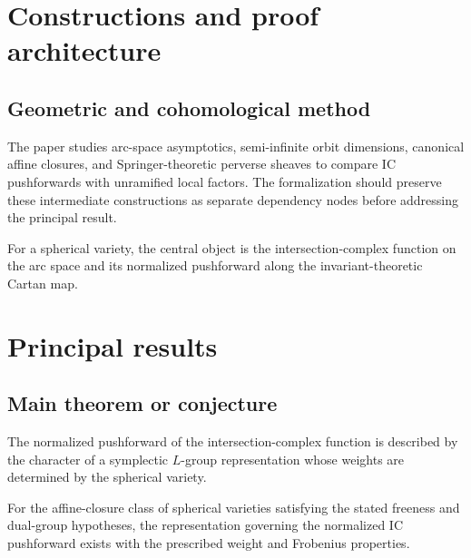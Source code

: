 \chapter{Constructions and proof architecture}
\label{chap:intersection-complexes-unramified-l-factors-method}

\section{Geometric and cohomological method}
\label{sec:intersection-complexes-unramified-l-factors-method}

The paper studies arc-space asymptotics, semi-infinite orbit dimensions, canonical affine closures, and Springer-theoretic perverse sheaves to compare IC pushforwards with unramified local factors. The formalization should preserve these intermediate constructions
as separate dependency nodes before addressing the principal result.

\begin{definition}
\label{intersection-complexes-unramified-l-factors-central-object}
For a spherical variety, the central object is the intersection-complex function on the arc space and its normalized pushforward along the invariant-theoretic Cartan map.
\notready
\end{definition}

\chapter{Principal results}
\label{chap:intersection-complexes-unramified-l-factors-results}

\section{Main theorem or conjecture}
\label{sec:intersection-complexes-unramified-l-factors-results}

\begin{conjecture}
\label{intersection-complexes-unramified-l-factors-main}
The normalized pushforward of the intersection-complex function is described by the character of a symplectic $L$-group representation whose weights are determined by the spherical variety.
\notready
\end{conjecture}

\begin{theorem}
\label{intersection-complexes-unramified-l-factors-secondary}
For the affine-closure class of spherical varieties satisfying the stated freeness and dual-group hypotheses, the representation governing the normalized IC pushforward exists with the prescribed weight and Frobenius properties.
\notready
\end{theorem}

